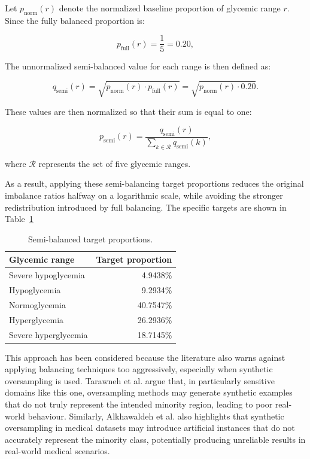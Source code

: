 Let \(p_{\mathrm{norm}}(r)\) denote the normalized baseline proportion of glycemic range \(r\). Since the fully balanced proportion is:

\[
p_{\mathrm{full}}(r)=\frac{1}{5}=0.20,
\]

The unnormalized semi-balanced value for each range is then defined as:

\[
q_{\mathrm{semi}}(r)
=
\sqrt{
p_{\mathrm{norm}}(r)
\cdot
p_{\mathrm{full}}(r)
}
=
\sqrt{
p_{\mathrm{norm}}(r)
\cdot 0.20
}.
\]

These values are then normalized so that their sum is equal to one:

\[
p_{\mathrm{semi}}(r)
=
\frac{
q_{\mathrm{semi}}(r)
}{
\displaystyle\sum_{k \in \mathcal{R}} q_{\mathrm{semi}}(k)
},
\]

where \(\mathcal{R}\) represents the set of five glycemic ranges.

As a result, applying these semi-balancing target proportions reduces the original imbalance ratios halfway on a logarithmic scale, while avoiding the stronger redistribution introduced by full balancing. The specific targets are shown in Table~\ref{tab:semi_balanced_target_proportions}

\begin{table}[htbp]
    \centering
    \caption{Semi-balanced target proportions.}
    \label{tab:semi_balanced_target_proportions}
    \begin{tabular}{lr}
        \hline
        \textbf{Glycemic range} & \textbf{Target proportion} \\
        \hline
        Severe hypoglycemia & 4.9438\% \\
        Hypoglycemia & 9.2934\% \\
        Normoglycemia & 40.7547\% \\
        Hyperglycemia & 26.2936\% \\
        Severe hyperglycemia & 18.7145\% \\
        \hline
    \end{tabular}
\end{table}

This approach has been considered because the literature also warns against applying balancing techniques too aggressively, especially when synthetic oversampling is used. Tarawneh et al. \cite{9761871} argue that, in particularly sensitive domains like this one, oversampling methods may generate synthetic examples that do not truly represent the intended minority region, leading to poor real-world behaviour. Similarly, Alkhawaldeh et al. \cite{alkhawaldeh2023challenges} also highlights that synthetic oversampling in medical datasets may introduce artificial instances that do not accurately represent the minority class, potentially producing unreliable results in real-world medical scenarios.

